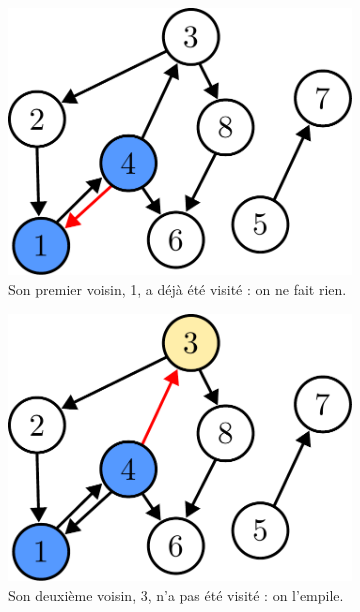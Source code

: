 \documentclass{article}
\begin{document}
\begin{itemize}
\begin{figure}[b]
		\begin{subfigure}[t]{0.3\linewidth}
			\centering
			\includegraphics[width=0.9\linewidth]{../figures/bfs4.pdf}
			\caption{Son premier voisin, 1, a déjà été visité : on ne fait rien.}
		\end{subfigure}\hfill%
		\begin{subfigure}[t]{0.3\linewidth}
			\centering
			\includegraphics[width=0.9\linewidth]{../figures/bfs5.pdf}
			\caption{Son deuxième voisin, 3, n'a pas été visité : on l'empile.}
		\end{subfigure}\hfill%
		\begin{subfigure}[t]{0.3\linewidth}
			\centering

\end{subfigure}
\end{figure}
\end{itemize}
\end{document}
